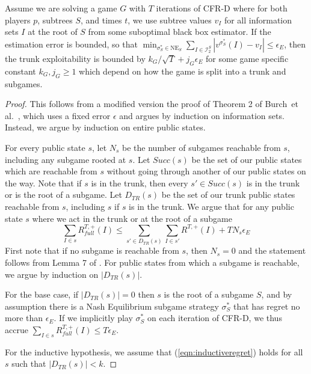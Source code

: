 \begin{lemma}
  Assume we are solving a game $G$ with $T$ iterations of CFR-D where
  for both players $p$, subtrees $S$, and times $t$, we use subtree
  values $v_I$ for all information sets $I$ at the root of $S$ from
  some suboptimal black box estimator. If the estimation error is
  bounded, so that $\min_{\sigma_S^* \in \text{NE}_S} \sum_{I \in
    \mathcal{I}^S_2} |v^{\sigma_S^*} (I)-v_I| \le \epsilon_E$, then
  the trunk exploitability is bounded by $k_G/\sqrt{T} +
  j_G\epsilon_E$ for some game specific constant $k_G,j_G \ge 1$ which
  depend on how the game is split into a trunk and subgames.
  \label{lem:cfrd_estimator}
\end{lemma}
\begin{proof}
  This follows from a modified version the proof of Theorem 2 of
  Burch~et al.~\cite{cprg:cfrd}, which uses a fixed error $\epsilon$
  and argues by induction on information sets. Instead, we argue
  by induction on entire public states.

  For every public state $s$, let $N_s$ be the number of subgames
  reachable from $s$, including any subgame rooted at $s$. Let $Succ(s)$
  be the set of our public states which are reachable from $s$ without going through
  another of our public states on the way. Note that if $s$ is in the trunk, then every
  $s' \in Succ(s)$ is in the trunk or is the root of a subgame. Let $D_{TR}(s)$
  be the set of our trunk public states reachable from $s$, including $s$ if $s$ is in the trunk.
  We argue that for any public state $s$ where we act in the trunk or at the root of a subgame
  \begin{equation}
  \label{eqn:inductiveregret}
  \sum_{I \in s} R^{T,+}_{full}(I) \leq \sum_{s' \in D_{TR}(s)} \sum_{I \in s'} R^{T,+}(I) + TN_s\epsilon_E
  \end{equation}
  First note that if no subgame is reachable from $s$, then $N_s = 0$
  and the statement follows from Lemma 7 of \cite{ZinkevichEtAl07}.
  For public states from which a subgame is reachable, we argue by
  induction on $|D_{TR}(s)|$. 
   
  For the base case, if $|D_{TR}(s)| = 0$ then $s$ is the root of a subgame $S$,
  and by assumption there is a Nash Equilibrium subgame strategy $\sigma_S^*$
  that has regret no more than $\epsilon_E$. If we implicitly play $\sigma_S^*$
  on each iteration of CFR-D, we thus accrue $\sum_{I \in s} R^{T,+}_{full}(I) \leq T\epsilon_E$.

  For the inductive hypothesis, we assume that (\ref{eqn:inductiveregret}) holds for all $s$
  such that $|D_{TR}(s)| < k$.


\end{proof}
